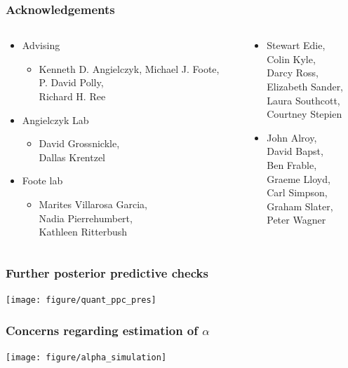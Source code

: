 \documentclass{beamer}
\begin{document}
\begin{frame}
  \frametitle{Acknowledgements}
  \begin{columns}
    \begin{column}{0.5\textwidth}
      \begin{itemize}
        \item Advising
          \begin{itemize}
            \item Kenneth D. Angielczyk, Michael J. Foote, \\P. David Polly, \\Richard H. Ree
          \end{itemize}
        \item Angielczyk Lab
          \begin{itemize}
            \item {\small{David Grossnickle, \\Dallas Krentzel}}
          \end{itemize}
        \item Foote lab
          \begin{itemize}
            \item {\small{Marites Villarosa Garcia, \\Nadia Pierrehumbert, \\Kathleen Ritterbush}}
          \end{itemize}
      \end{itemize}
    \end{column}
    \begin{column}{0.5\textwidth}
      \begin{itemize}
        \item {\footnotesize{Stewart Edie, \\Colin Kyle, \\Darcy Ross, \\Elizabeth Sander, \\Laura Southcott, \\Courtney Stepien}}
        \item {\footnotesize{John Alroy, \\David Bapst, \\Ben Frable, \\Graeme Lloyd, \\Carl Simpson, \\Graham Slater, \\Peter Wagner}}
      \end{itemize}
    \end{column}
  \end{columns}
\end{frame}

\appendix

\begin{frame}
  \frametitle{Further posterior predictive checks}
  
  \texttt{[image: figure/quant\_ppc\_pres]}
\end{frame}

\begin{frame}
  \frametitle{Concerns regarding estimation of \(\alpha\)}
  
  \texttt{[image: figure/alpha\_simulation]}
\end{frame}
\end{document}

